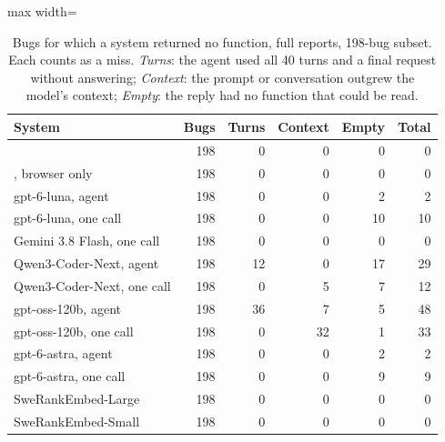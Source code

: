 \begin{table}[t]
\centering
\small
\caption{Bugs for which a system returned no function, full reports, 198-bug subset. Each counts as a miss. \emph{Turns}: the agent used all 40 turns and a final request without answering; \emph{Context}: the prompt or conversation outgrew the model's context; \emph{Empty}: the reply had no function that could be read.}
\label{tab:noanswer}
\begin{adjustbox}{max width=\linewidth}\begin{tabular}{lrrrrr}
\toprule
System & Bugs & Turns & Context & Empty & Total \\
\midrule
\toolgpu{} & 198 & 0 & 0 & 0 & 0 \\
\tool{}, browser only & 198 & 0 & 0 & 0 & 0 \\
gpt-6-luna, agent & 198 & 0 & 0 & 2 & 2 \\
gpt-6-luna, one call & 198 & 0 & 0 & 10 & 10 \\
Gemini 3.8 Flash, one call & 198 & 0 & 0 & 0 & 0 \\
Qwen3-Coder-Next, agent & 198 & 12 & 0 & 17 & 29 \\
Qwen3-Coder-Next, one call & 198 & 0 & 5 & 7 & 12 \\
gpt-oss-120b, agent & 198 & 36 & 7 & 5 & 48 \\
gpt-oss-120b, one call & 198 & 0 & 32 & 1 & 33 \\
gpt-6-astra, agent & 198 & 0 & 0 & 2 & 2 \\
gpt-6-astra, one call & 198 & 0 & 0 & 9 & 9 \\
SweRankEmbed-Large & 198 & 0 & 0 & 0 & 0 \\
SweRankEmbed-Small & 198 & 0 & 0 & 0 & 0 \\
\bottomrule
\end{tabular}\end{adjustbox}
\end{table}
